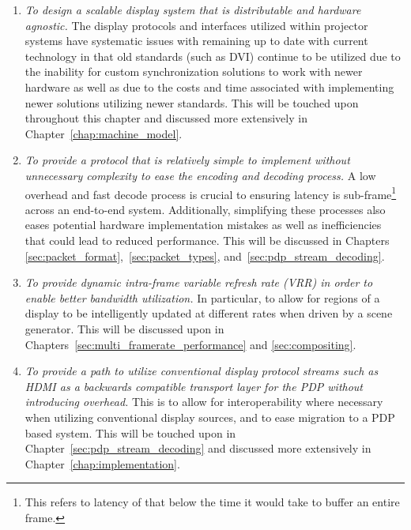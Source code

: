     \begin{enumerate}
        \item {\em To design a scalable display system that is distributable and hardware agnostic.} The display protocols and interfaces utilized within projector systems have systematic issues with remaining up to date with current technology in that old standards (such as DVI) continue to be utilized due to the inability for custom synchronization solutions to work with newer hardware as well as due to the costs and time associated with implementing newer solutions utilizing newer standards. This will be touched upon throughout this chapter and discussed more extensively in Chapter~\ref{chap:machine_model}.
        \item {\em To provide a protocol that is relatively simple to implement without unnecessary complexity to ease the encoding and decoding process.} A low overhead and fast decode process is crucial to ensuring latency is sub-frame\footnote{This refers to latency of that below the time it would take to buffer an entire frame.} across an end-to-end system. Additionally, simplifying these processes also eases potential hardware implementation mistakes as well as inefficiencies that could lead to reduced performance. This will be discussed in Chapters~ \ref{sec:packet_format},~\ref{sec:packet_types}, and~\ref{sec:pdp_stream_decoding}.
        \item {\em To provide dynamic intra-frame variable refresh rate (VRR) in order to enable better bandwidth utilization.} In particular, to allow for regions of a display to be intelligently updated at different rates when driven by a scene generator. This will be discussed upon in Chapters~\ref{sec:multi_framerate_performance} and \ref{sec:compositing}.
        \item {\em To provide a path to utilize conventional display protocol streams such as HDMI as a backwards compatible transport layer for the PDP without introducing overhead.} This is to allow for interoperability where necessary when utilizing conventional display sources, and to ease migration to a PDP based system. This will be touched upon in Chapter~\ref{sec:pdp_stream_decoding} and discussed more extensively in Chapter~\ref{chap:implementation}.
    \end{enumerate}


